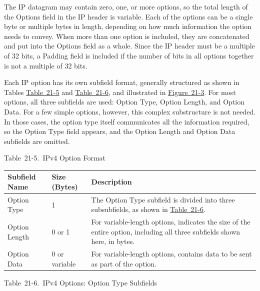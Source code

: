 \documentclass[b5paper,11pt]{memoir}
\begin{document}
The IP datagram may contain zero, one, or more options, so the total
length of the Options field in the IP header is variable. Each of the
options can be a single byte or multiple bytes in length, depending on
how much information the option needs to convey. When more than one
option is included, they are concatenated and put into the Options field
as a whole. Since the IP header must be a multiple of 32 bits, a Padding
field is included if the number of bits in all options together is not a
multiple of 32 bits.

Each IP option has its own subfield format, generally structured as
shown in Tables
\protect\hyperlink{ch21s03.htmlux5cux23ipv_option_format}{Table~21-5}
and
\protect\hyperlink{ch21s03.htmlux5cux23ipv_options_option_type_subfields}{Table~21-6},
and illustrated in
\protect\hyperlink{ch21s03.htmlux5cux23ipv4_options_field_format_this_diagram_s}{Figure~21-3}.
For most options, all three subfields are used: Option
\protect\hypertarget{ch21s03.htmlux5cux23idx-CHP-21-0790}{}{}Type,
Option Length, and Option Data. For a few simple options, however, this
complex substructure is not needed. In those cases, the option type
itself communicates all the information required, so the Option Type
field appears, and the Option Length and Option Data subfields are
omitted.

\protect\hypertarget{ch21s03.htmlux5cux23ipv_option_format}{}{}

Table~21-5.~IPv4 Option Format

\begin{longtable}[]{@{}lll@{}}
\toprule
Subfield Name & Size (Bytes) & Description\tabularnewline
\midrule
\endhead
Option Type & 1 & The Option Type subfield is divided into three
subsubfields, as shown in
\protect\hyperlink{ch21s03.htmlux5cux23ipv_options_option_type_subfields}{Table~21-6}.\tabularnewline
Option Length & 0 or 1 & For variable-length
\protect\hypertarget{ch21s03.htmlux5cux23idx-CHP-21-0791}{}{}options,
indicates the size of the entire option, including all three subfields
shown here, in bytes.\tabularnewline
Option Data & 0 or variable & For variable-length
\protect\hypertarget{ch21s03.htmlux5cux23idx-CHP-21-0792}{}{}options,
contains data to be sent as part of the option.\tabularnewline
\bottomrule
\end{longtable}

\protect\hypertarget{ch21s03.htmlux5cux23ipv_options_option_type_subfields}{}{}

Table~21-6.~IPv4 Options: Option Type Subfields
\end{document}
